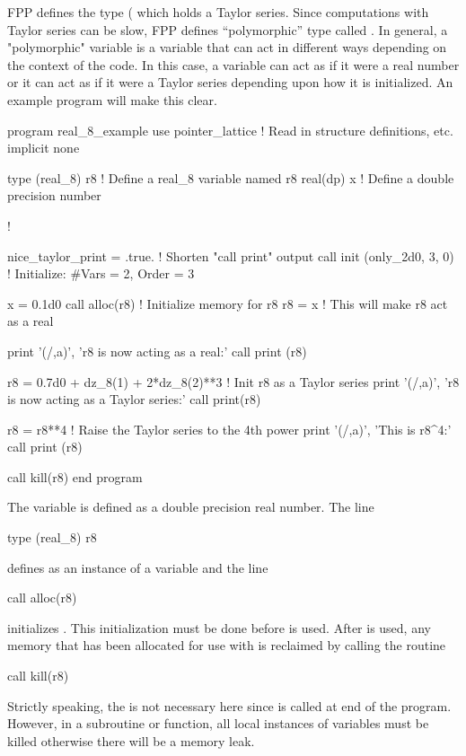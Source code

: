 \documentclass{hitec}     %
\begin{document}
FPP defines the  type ( which holds a Taylor series. Since computations
with Taylor series can be slow, FPP defines ``polymorphic'' type called . In general, a
"polymorphic" variable is a variable that can act in different ways depending on the context of the
code. In this case, a  variable can act as if it were a real number or it can act as if
it were a Taylor series depending upon how it is initialized. An example program will make this clear.
\begin{code}
program real_8_example
use pointer_lattice   ! Read in structure definitions, etc.
implicit none

type (real_8) r8      ! Define a real_8 variable named r8
real(dp) x            ! Define a double precision number

!

nice_taylor_print = .true.    ! Shorten "call print" output
call init (only_2d0, 3, 0)    ! Initialize: #Vars = 2, Order = 3

x = 0.1d0
call alloc(r8)          ! Initialize memory for r8
r8 = x                  ! This will make r8 act as a real

print '(/,a)', 'r8 is now acting as a real:'
call print (r8)

r8 = 0.7d0 + dz_8(1) + 2*dz_8(2)**3 ! Init r8 as a Taylor series
print '(/,a)', 'r8 is now acting as a Taylor series:'
call print(r8)

r8 = r8**4  ! Raise the Taylor series to the 4th power
print '(/,a)', 'This is r8^4:'
call print (r8)

call kill(r8)
end program
\end{code}
The variable  is defined as a double precision real number. The line
\begin{example}
  type (real_8) r8
\end{example}
defines  as an instance of a  variable and the line
\begin{example}
  call alloc(r8)
\end{example}
initializes . This initialization must be done before  is used. After  is used, any memory that has been allocated for use with  is reclaimed by calling the  routine
\begin{example}
  call kill(r8)
\end{example}
Strictly speaking, the  is not necessary here since  is called at end of the program. However, in a subroutine or function, all local instances of  variables must be killed otherwise there will be a memory leak.
\end{document}
